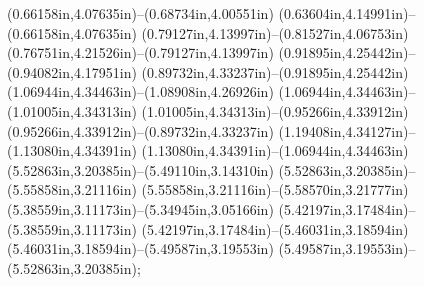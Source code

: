 (0.66158in,4.07635in)--(0.68734in,4.00551in) (0.63604in,4.14991in)--(0.66158in,4.07635in) (0.79127in,4.13997in)--(0.81527in,4.06753in) (0.76751in,4.21526in)--(0.79127in,4.13997in) (0.91895in,4.25442in)--(0.94082in,4.17951in) (0.89732in,4.33237in)--(0.91895in,4.25442in) (1.06944in,4.34463in)--(1.08908in,4.26926in) (1.06944in,4.34463in)--(1.01005in,4.34313in) (1.01005in,4.34313in)--(0.95266in,4.33912in) (0.95266in,4.33912in)--(0.89732in,4.33237in) (1.19408in,4.34127in)--(1.13080in,4.34391in) (1.13080in,4.34391in)--(1.06944in,4.34463in) (5.52863in,3.20385in)--(5.49110in,3.14310in) (5.52863in,3.20385in)--(5.55858in,3.21116in) (5.55858in,3.21116in)--(5.58570in,3.21777in) (5.38559in,3.11173in)--(5.34945in,3.05166in) (5.42197in,3.17484in)--(5.38559in,3.11173in) (5.42197in,3.17484in)--(5.46031in,3.18594in) (5.46031in,3.18594in)--(5.49587in,3.19553in) (5.49587in,3.19553in)--(5.52863in,3.20385in);
